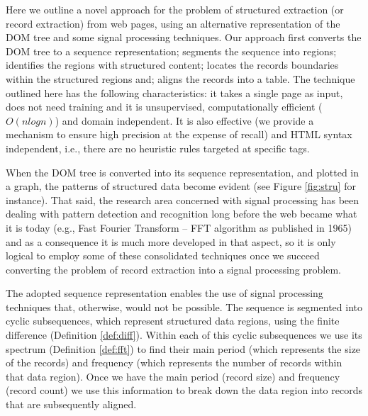 \documentclass{vldb}
\begin{document}
Here we outline a novel approach for the problem of structured extraction (or
record extraction) from web pages, using an alternative representation of the
DOM tree and some signal processing techniques. Our approach first converts the
DOM tree to a sequence representation; segments the sequence into regions;
identifies the regions with structured content; locates the records boundaries
within the structured regions and; aligns the records into a table. The
technique outlined here has the following characteristics: it takes a single
page as input, does not need training and it is unsupervised, computationally
efficient ($O(nlogn)$) and domain independent. It is also effective (we provide
a mechanism to ensure high precision at the expense of recall) and HTML syntax
independent, i.e., there are no heuristic rules targeted at specific tags.

When the DOM tree is converted into its sequence representation, and plotted in
a graph, the patterns of structured data become evident (see Figure
\ref{fig:stru} for instance). That said, the research area concerned with signal
processing has been dealing with pattern detection and recognition long before
the web became what it is today (e.g., Fast Fourier Transform --
FFT\cite{fft1965} algorithm as published in 1965) and as a consequence it is
much more developed in that aspect, so it is only logical to employ some of
these consolidated techniques once we succeed converting the problem of
record extraction into a signal processing problem.

The adopted sequence representation enables the use of signal processing
techniques that, otherwise, would not be possible. The sequence is segmented
into cyclic subsequences, which represent structured data regions, using the
finite difference (Definition \ref{def:diff}). Within each of this cyclic
subsequences we use its spectrum (Definition \ref{def:fft}) to find their main
period (which represents the size of the records) and frequency (which
represents the number of records within that data region). Once we have the
main period (record size) and frequency (record count) we use this information
to break down the data region into records that are subsequently aligned.
\end{document}
